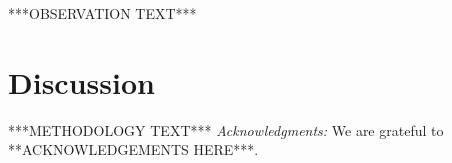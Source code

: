 \documentclass[preprint2]{aastex}
\begin{document}
***OBSERVATION TEXT***

\section{Discussion}

***METHODOLOGY TEXT***
{\it Acknowledgments:} We are grateful to **ACKNOWLEDGEMENTS HERE***.

\end{document}
